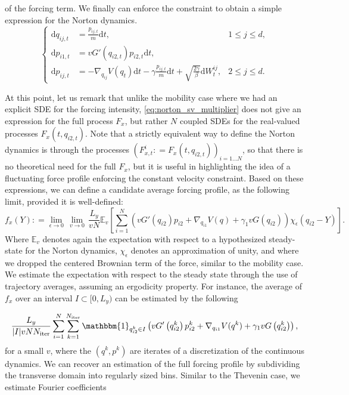 \documentclass[a4paper,10pt,twoside,leqno]{report}
\newcommand{\E}{\mathbb{E}}
\renewcommand{\leq}{\leqslant}
\newcommand{\dif}{\mathrm{d}}
\newcommand{\defeq}{\mathrel{\mathop:}=}
\newcommand{\1}{\mathbbm{1}}
\begin{document}
    of the forcing term. We finally can enforce the constraint to obtain a simple expression for the Norton dynamics.
    \begin{equation}
        \label{eq:norton_sv_dynamics}
        \left\{\begin{aligned}
            \dif q_{ij,t}&=\frac{p_{ij,t}}m\dif t,&1\leq j\leq d,\\
            \dif p_{i1,t}&=vG'\left(q_{i2,t}\right)p_{i2,t}\dif t,&\\
            \dif p_{ij,t}&=-\nabla_{q_{ij}}V(q_t)\dif t-\gamma \frac{p_{ij,t}}m\dif t+\sqrt{\frac{2\gamma}\beta}\dif W_t^{ij},&2\leq j\leq d.
        \end{aligned}\right.
    \end{equation}
    
    At this point, let us remark that unlike the mobility case where we had an explicit SDE for the forcing intensity, \eqref{eq:norton_sv_multiplier} does not give an expression for the full process $F_x$, but rather $N$ coupled SDEs for the real-valued processes $F_x(t,q_{i2,t})$.
    Note that a strictly equivalent way to define the Norton dynamics is through the processes $\left(F_{x,t}^i \defeq F_x(t,q_{i2,t})\right)_{i=1\dots N}$, so that there is no theoretical need for the full $F_x$, but it is useful in highlighting the idea of a fluctuating force profile enforcing the constant velocity constraint.
    Based on these expressions, we can define a candidate average forcing profile, as the following limit, provided it is well-defined:
    \begin{equation}
        \label{eq:fx_definition}
        f_x(Y)\defeq \underset{\epsilon \to 0}{\lim} \, \underset{v \to 0}{\lim}\, \frac{L_y}{vN}\E_v\left[\sum_{i=1}^N \left(vG'\left(q_{i2}\right)p_{i2}+\nabla_{q_{i1}}V(q)+\gamma_1vG\left(q_{i2}\right)\right)\chi_\epsilon(q_{i2}-Y)\right].
    \end{equation}
    Where $\E_v$ denotes again the expectation with respect to a hypothesized steady-state for the Norton dynamics,  $\chi_\epsilon$ denotes an approximation of unity, and where we dropped the centered Brownian term of the force, similar to the mobility case.
    We estimate the expectation with respect to the steady state through the use of trajectory averages, assuming an ergodicity property. For instance, the average of $f_x$ over an interval $I \subset [0,L_y)$ can be estimated by the following
    
    \begin{equation}
        \label{eq:norton_forcing_estimator}
        \frac{L_y}{|I|vN N_{\mathrm{iter}}}\sum_{i=1}^N\sum_{k=1}^{N_{\mathrm{iter}}}\1_{q_{i2}^k \in I}\left(vG'\left(q_{i2}^k\right)p_{i2}^k+\nabla_{q_{i1}}V(q^k)+\gamma_1vG\left(q_{i2}^k\right)\right),
    \end{equation}
    for a small $v$, where the $(q^k,p^k)$ are iterates of a discretization of the continuous dynamics.
    We can recover an estimation of the full forcing profile by subdividing the transverse domain into regularly sized bins. Similar to the Thevenin case, we estimate Fourier coefficients 
    
\end{document}

